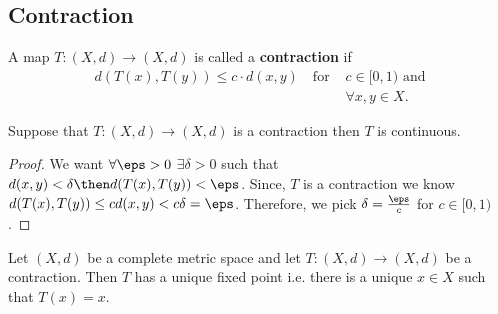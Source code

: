 \documentclass[12pt, a4paper]{article}
\begin{document}
\subsection{Contraction}

\begin{definition}
    A map \(T : (X,d) \to (X,d)\) is called a \textbf{contraction} if 
    \[\begin{aligned}
        d(T(x),T(y)) \leq c \cdot d(x,y) \quad \text{for } &c \in [0,1) \text{ and}\\
        &\forall x,y \in X.
    \end{aligned}\]
\end{definition}

\begin{proposition}
    Suppose that \(T : (X,d) \to (X,d)\) is a contraction then \(T\) is continuous.
\end{proposition}

\begin{proof}
    We want \(\forall \eps>0\) \(\exists \delta>0\) such that \(d(x,y)<\delta \then d(T(x),T(y))<\eps\). Since, \(T\) is a contraction we know \(d(T(x),T(y)) \leq cd(x,y)<c\delta=\eps\). Therefore, we pick \(\delta = \frac{\eps}{c}\) for \(c \in [0,1)\).
\end{proof}

\begin{mdthm}
    Let \((X,d)\) be a complete metric space and let \(T : (X,d) \to (X,d)\) be a contraction. Then \(T\) has a unique fixed point i.e. there is a unique \(x \in X\) such that \(T(x)=x\).
\end{mdthm}
\end{document}
